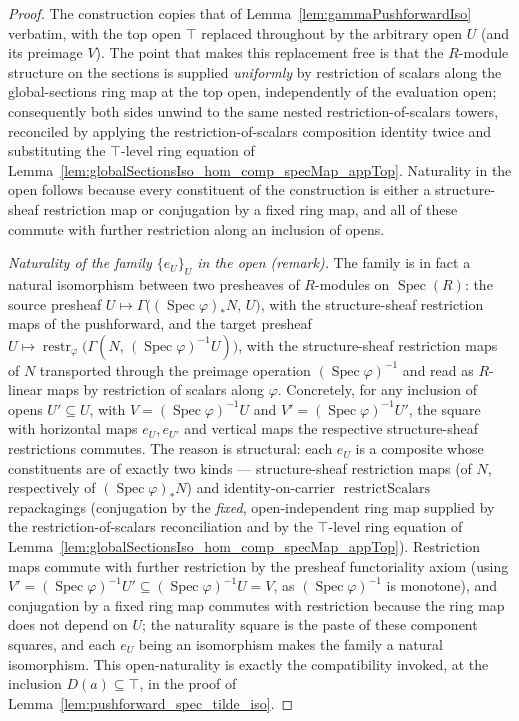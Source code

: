 \begin{proof}
  The construction copies that of Lemma~\ref{lem:gammaPushforwardIso} verbatim,
  with the top open \(\top\) replaced throughout by the arbitrary open \(U\) (and
  its preimage \(V\)). The point that makes this replacement free is that the
  \(R\)-module structure on the sections is supplied \emph{uniformly} by
  restriction of scalars along the global-sections ring map at the top open,
  independently of the evaluation open; consequently both sides unwind to the same
  nested restriction-of-scalars towers, reconciled by applying the
  restriction-of-scalars composition identity twice and substituting the
  \(\top\)-level ring equation of
  Lemma~\ref{lem:globalSectionsIso_hom_comp_specMap_appTop}. Naturality in the open
  follows because every constituent of the construction is either a structure-sheaf
  restriction map or conjugation by a fixed ring map, and all of these commute with
  further restriction along an inclusion of opens.

  \medskip
  \emph{Naturality of the family \(\{e_U\}_U\) in the open (remark).} The family is
  in fact a natural isomorphism between two presheaves of \(R\)-modules on
  \(\operatorname{Spec}(R)\): the source presheaf
  \(U \mapsto \Gamma\bigl((\operatorname{Spec}\varphi)_* N,\, U\bigr)\), with the
  structure-sheaf restriction maps of the pushforward, and the target presheaf
  \(U \mapsto
    \operatorname{restr}_\varphi\bigl(\Gamma(N,\, (\operatorname{Spec}\varphi)^{-1}U)\bigr)\),
  with the structure-sheaf restriction maps of \(N\) transported through the preimage
  operation \((\operatorname{Spec}\varphi)^{-1}\) and read as \(R\)-linear maps by
  restriction of scalars along \(\varphi\). Concretely, for any inclusion of opens
  \(U' \subseteq U\), with \(V = (\operatorname{Spec}\varphi)^{-1}U\) and
  \(V' = (\operatorname{Spec}\varphi)^{-1}U'\), the square with horizontal maps
  \(e_U, e_{U'}\) and vertical maps the respective structure-sheaf restrictions
  commutes. The reason is structural: each \(e_U\) is a composite whose constituents
  are of exactly two kinds — structure-sheaf restriction maps (of \(N\),
  respectively of \((\operatorname{Spec}\varphi)_* N\)) and identity-on-carrier
  \(\operatorname{restrictScalars}\) repackagings (conjugation by the \emph{fixed},
  open-independent ring map supplied by the restriction-of-scalars reconciliation and
  by the \(\top\)-level ring equation of
  Lemma~\ref{lem:globalSectionsIso_hom_comp_specMap_appTop}). Restriction maps commute
  with further restriction by the presheaf functoriality axiom (using
  \(V' = (\operatorname{Spec}\varphi)^{-1}U' \subseteq
  (\operatorname{Spec}\varphi)^{-1}U = V\), as \((\operatorname{Spec}\varphi)^{-1}\) is
  monotone), and conjugation by a fixed ring map commutes with restriction because the
  ring map does not depend on \(U\); the naturality square is the paste of these
  component squares, and each \(e_U\) being an isomorphism makes the family a natural
  isomorphism. This open-naturality is exactly the compatibility invoked, at the
  inclusion \(D(a) \subseteq \top\), in the proof of
  Lemma~\ref{lem:pushforward_spec_tilde_iso}.
\end{proof}

